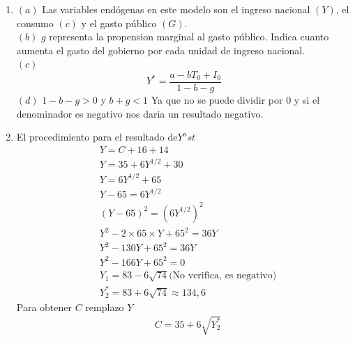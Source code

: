 \begin{ejercicio}
\begin{enumerate}
$$\begin{aligned}
        \end{aligned}
        $$
        Para entender que es cada variable ver cuadro \ref{Significado_Variables_ingreso_nacional}
        \item \((a)\) Las variables endógenas en este modelo son el ingreso nacional \((Y)\), el consumo \((c)\) y el gasto público \((G)\).\\
        \((b)\) \(g\) representa la propension marginal al gasto público. Indica cuanto aumenta el gasto del gobierno por cada unidad de ingreso nacional.\\
        \((c)\) \[
        Y^\ast=\frac{a-bT_0+I_0}{1-b-g}
        \]
        \((d)\) \(1-b-g > 0\) y \(b+g < 1\) Ya que no se puede dividir por \(0\) y si el denominador es negativo nos daria un resultado negativo.
        \item El procedimiento para el resultado de\(Y^ast\)
        $$
        \begin{aligned}
            & Y = C+16+14 \\
            & Y = 35+6Y^{1/2}+30 \\
            & Y = 6Y^{1/2}+65 \\
            & Y-65 = 6Y^{1/2} \\
            & (Y-65)^2=(6Y^{1/2})^2 \\ 
            & Y^2 - 2\times 65 \times Y + 65^2 = 36Y \\
            & Y^2 -130Y+65^2=36 Y \\
            & Y^2 -166Y + 65^2 = 0 \\
            & Y_1 = 83-6\sqrt{74} \text{(No verifica, es negativo)} \\
            & Y_2^\ast = 83+6\sqrt{74}\approx 134,6
        \end{aligned}
        $$
        Para obtener \(C\) remplazo \(Y\)
        $$
        \begin{aligned}
            & C = 35+6\sqrt{Y_2^\ast} 
        \end{aligned}
        $$
    \end{enumerate}
\end{ejercicio}
        
